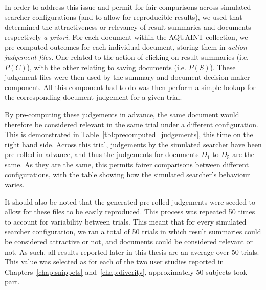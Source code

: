 In order to address this issue and permit for fair comparisons across simulated searcher configurations (and to allow for reproducible results), we used  that determined the attractiveness or relevancy of result summaries and documents respectively \emph{a priori.} For each document within the AQUAINT collection, we pre-computed outcomes for each individual document, storing them in \emph{action judgement files.} One related to the action of clicking on result summaries (i.e. $P(C)$), with the other relating to saving documents (i.e. $P(S)$). These judgement files were then used by the summary and document decision maker component. All this component had to do was then perform a simple lookup for the corresponding document judgement for a given trial.

By pre-computing these judgements in advance, the same document would therefore be considered relevant in the same trial under a different configuration. This is demonstrated in Table~\ref{tbl:precomputed_judgements}, this time on the right hand side. Across this trial, judgements by the simulated searcher have been pre-rolled in advance, and thus the judgements for documents $D_1$ to $D_5$ are the same. As they are the same, this permits fairer comparisons between different configurations, with the table showing how the simulated searcher's behaviour varies.

It should also be noted that the generated pre-rolled judgements were seeded to allow for these files to be easily reproduced. This process was repeated 50 times to account for variability between trials. This meant that for every simulated searcher configuration, we ran a total of 50 trials in which result summaries could be considered attractive or not, and documents could be considered relevant or not. As such, all results reported later in this thesis are an average over 50 trials. This value was selected as for each of the two user studies reported in Chapters~\ref{chap:snippets} and~\ref{chap:diverity}, approximately 50 subjects took part.

